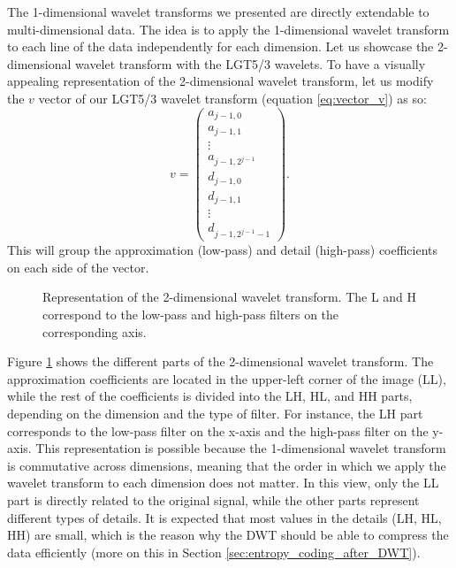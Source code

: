 The 1-dimensional wavelet transforms we presented are directly extendable to multi-dimensional data.
The idea is to apply the 1-dimensional wavelet transform to each line of the data independently for each dimension.
Let us showcase the 2-dimensional wavelet transform with the LGT5/3 wavelets.
To have a visually appealing representation of the 2-dimensional wavelet transform, let us modify the $v$ vector of our LGT5/3 wavelet transform (equation \ref{eq:vector_v}) as so:
\begin{equation}
    v=\begin{pmatrix} a_{j-1,0}\\ a{_{j-1,1}}\\ \vdots\\ a_{j-1,2^{j-1}}\\ d_{j-1,0}\\ d_{j-1,1}\\ \vdots\\ d_{j-1,2^{j-1}-1} \end{pmatrix}.
\end{equation}
This will group the approximation (low-pass) and detail (high-pass) coefficients on each side of the vector.

\begin{figure}[htbp]
    \centering
    
    \caption{
        Representation of the 2-dimensional wavelet transform.
        The L and H correspond to the low-pass and high-pass filters on the corresponding axis.
    }
    \label{fig:2D_DWT}
\end{figure}

Figure \ref{fig:2D_DWT} shows the different parts of the 2-dimensional wavelet transform.
The approximation coefficients are located in the upper-left corner of the image (LL), while the rest of the coefficients is divided into the LH, HL, and HH parts, depending on the dimension and the type of filter.
For instance, the LH part corresponds to the low-pass filter on the x-axis and the high-pass filter on the y-axis.
This representation is possible because the 1-dimensional wavelet transform is commutative across dimensions, meaning that the order in which we apply the wavelet transform to each dimension does not matter.
In this view, only the LL part is directly related to the original signal, while the other parts represent different types of details.
It is expected that most values in the details (LH, HL, HH) are small, which is the reason why the DWT should be able to compress the data efficiently (more on this in Section \ref{sec:entropy_coding_after_DWT}).

